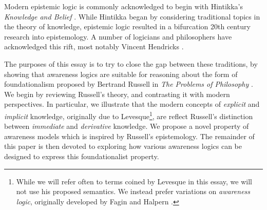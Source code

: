 Modern epistemic logic is commonly acknowledged to begin with
Hintikka's \emph{Knowledge and Belief}
\cite{hintikka_knowledge_1969}. While Hintikka began by considering
traditional topics in the theory of knowledge, epistemic logic
resulted in a bifurcation 20th century research into epistemology.  A number of
logicians and philosophers have acknowledged this rift, most notably
Vincent Hendricks \cite{hendricks_wheres_2006,
  hendricks_mainstream_2006}.

The purposes of this essay is to try to close the gap between these
traditions, by showing that awareness logics are suitable for
reasoning about the form of foundationalism proposed
by Bertrand Russell in \emph{The Problems of Philosophy}
\cite{russell_problems_1936}.  We begin by reviewing Russell's
theory, and contrasting it with modern perspectives.  In particular,
we illustrate that the modern concepts of \emph{explicit} and
\emph{implicit} knowledge, originally due to Levesque\footnote{While we will refer often to
  terms coined by Levesque in this essay, we will not use his
  proposed semantics.  We instead prefer variations on
  \emph{awareness logic}, originally developed by Fagin and Halpern
  \cite{fagin_belief_1988}.}\cite{levesque_logic_1984},  are reflect Russell's distinction between \emph{immediate} and \emph{derivative}
knowledge.  We propose a novel property of awareness models which
is inspired by Russell's epistemology.  The
remainder of this paper is then devoted to exploring how various awareness
logics can be designed to express this foundationalist property.

